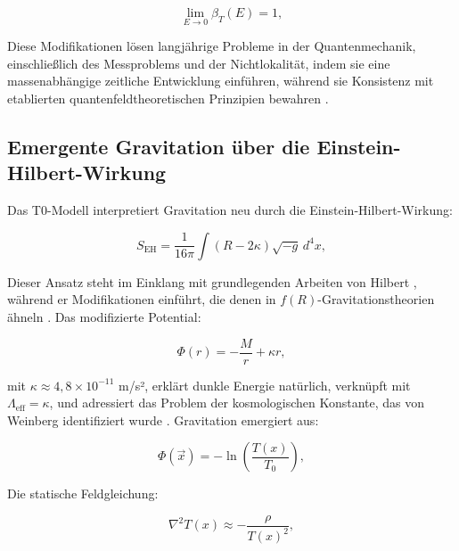 \documentclass[twocolumn,aps,prl]{revtex4-2}
\begin{document}
		\begin{equation}
			\lim_{E \to 0} \beta_T(E) = 1, \label{eq:beta_fixed_point}
		\end{equation}
		
		Diese Modifikationen lösen langjährige Probleme in der Quantenmechanik, einschließlich des Messproblems und der Nichtlokalität, indem sie eine massenabhängige zeitliche Entwicklung einführen, während sie Konsistenz mit etablierten quantenfeldtheoretischen Prinzipien bewahren \cite{pascher_quantum_2025}.
		
		\subsection{Emergente Gravitation über die Einstein-Hilbert-Wirkung}
		\label{subsec:gravitation}
		
		Das T0-Modell interpretiert Gravitation neu durch die Einstein-Hilbert-Wirkung:
		
		\begin{equation}
			S_{\text{EH}} = \frac{1}{16 \pi} \int (R - 2 \kappa) \sqrt{-g} \, d^4 x, \label{eq:einstein_hilbert}
		\end{equation}
		
		Dieser Ansatz steht im Einklang mit grundlegenden Arbeiten von Hilbert \cite{Hilbert1924}, während er Modifikationen einführt, die denen in $f(R)$-Gravitationstheorien ähneln \cite{Sotiriou2010, DeFelice2010}. Das modifizierte Potential:
		
		\begin{equation}
			\Phi(r) = -\frac{M}{r} + \kappa r, \label{eq:mod_potential}
		\end{equation}
		
		mit $\kappa \approx 4,8 \times 10^{-11}$ m/s², erklärt dunkle Energie natürlich, verknüpft mit $\Lambda_{\text{eff}} = \kappa$, und adressiert das Problem der kosmologischen Konstante, das von Weinberg identifiziert wurde \cite{Weinberg1989}. Gravitation emergiert aus:
		
		\begin{equation}
			\Phi(\vec{x}) = -\ln\left(\frac{T(x)}{T_0}\right), \label{eq:phi_from_t}
		\end{equation}
		
		Die statische Feldgleichung:
		
		\begin{equation}
			\nabla^2 T(x) \approx -\frac{\rho}{T(x)^2}, \label{eq:static_field}
		\end{equation}
		
\end{document}
